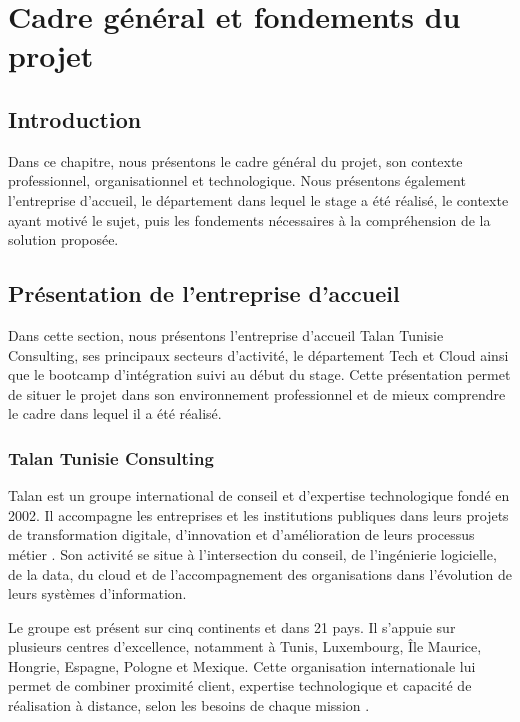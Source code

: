 
\chapter{Cadre général et fondements du projet}

\section*{Introduction}

Dans ce chapitre, nous présentons le cadre général du projet, son contexte professionnel, organisationnel et technologique. Nous présentons également l'entreprise d'accueil, le département dans lequel le stage a été réalisé, le contexte ayant motivé le sujet, puis les fondements nécessaires à la compréhension de la solution proposée.

\section{Présentation de l'entreprise d'accueil}

Dans cette section, nous présentons l'entreprise d'accueil Talan Tunisie Consulting, ses principaux secteurs d'activité, le département Tech et Cloud ainsi que le bootcamp d'intégration suivi au début du stage. Cette présentation permet de situer le projet dans son environnement professionnel et de mieux comprendre le cadre dans lequel il a été réalisé.

\subsection{Talan Tunisie Consulting}

Talan est un groupe international de conseil et d'expertise technologique fondé en 2002. Il accompagne les entreprises et les institutions publiques dans leurs projets de transformation digitale, d'innovation et d'amélioration de leurs processus métier \cite{talan_org}. Son activité se situe à l'intersection du conseil, de l'ingénierie logicielle, de la data, du cloud et de l'accompagnement des organisations dans l'évolution de leurs systèmes d'information.

Le groupe est présent sur cinq continents et dans 21 pays. Il s'appuie sur plusieurs centres d'excellence, notamment à Tunis, Luxembourg, Île Maurice, Hongrie, Espagne, Pologne et Mexique. Cette organisation internationale lui permet de combiner proximité client, expertise technologique et capacité de réalisation à distance, selon les besoins de chaque mission \cite{talan_org}.

